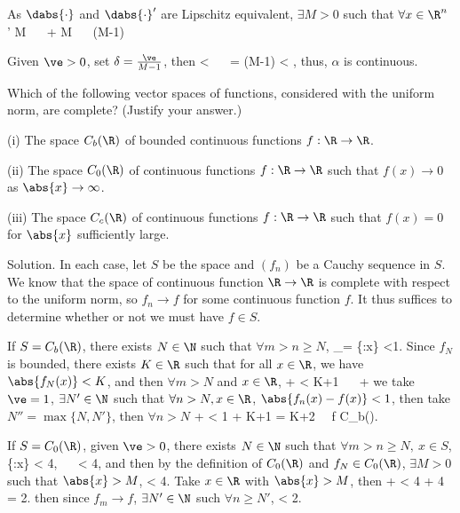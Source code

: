 As $\dabs{\cdot}$ and $\dabs{\cdot}'$ are Lipschitz equivalent, $\exists M>0$ such that $\forall x\in\R^n$
\be
{}' \leq M \ \ra \  + \leq M \ \ra \  \leq (M-1)
\ee

Given $\ve>0$, set $\delta = \frac {\ve}{M-1}$, then
\be
{} < \delta \ \ra \  =  \leq (M-1) < \ve,
\ee
thus, $\alpha$ is continuous.

\begin{exercise}
Which of the following vector spaces of functions, considered with the uniform norm, are complete? (Justify your answer.)
\ben
\item [(i)] The space $C_b(\R)$ of bounded continuous functions $f : \R \to \R$.
\item [(ii)] The space $C_0(\R)$ of continuous functions $f : \R \to \R$ such that $f(x) \to 0$ as $\abs{x} \to \infty$.
\item [(iii)] The space $C_c(\R)$ of continuous functions $f : \R \to \R$ such that $f(x) = 0$ for $\abs{x}$ sufficiently large.
\een
\end{exercise}

Solution. In each case, let $S$ be the space and $(f_n)$ be a Cauchy sequence in $S$. We know that the space of continuous function $\R\to\R$ is complete with respect to the uniform norm, so $f_n \to f$ for some continuous function $f$. It thus suffices to determine whether or not we must have $f\in S$.
\ben
\item [(i)] If $S=C_b(\R)$, there exists $N\in\N$ such that $\forall m>n\geq N$,
\be
{}_\infty = \sup\{:x\in\R\} <1.
\ee
Since $f_N$ is bounded, there exists $K\in\R$ such that for all $x\in\R$, we have $\abs{f_N(x)}<K$, and then $\forall m>N$ and $x\in\R$, 
\be
{} \leq {} +  < K+1 \ \ra \ \leq {} +  
\ee
we take $\ve = 1$, $\exists N'\in\N$ such that $\forall n > N, x\in\R$, $\abs{f_n(x) -f(x)} < 1$, then take $N'' = \max\{N,N'\}$, then $\forall n>N$
\be
{}\leq {} +  < 1 + K+1 = K+2 \ \ra \ f \in C_b(\R).
\ee

\item [(ii)] If $S=C_0(\R)$, given $\ve>0$, there exists $N\in\N$ such that $\forall m>n\geq N,\ x\in S$,
\be
\sup\{:x\in\R\} < \frac {\ve}4, \ \ra \  < \frac {\ve}4,
\ee
and then by the definition of $C_0(\R)$ and $f_N\in C_0(\R)$, $\exists M>0$ such that $\abs{x}>M$, 
\be
{} < \frac{\ve}4.
\ee
Take $x\in\R$ with $\abs{x}>M$, then 
\be
{} \leq {} +  < \frac {\ve}4 + \frac {\ve}4 = \frac {\ve}2.
\ee
then since $f_m \to f$, $\exists N'\in\N$ such $\forall n \geq N'$, 
\be
{} < \frac {\ve}2.
\ee

